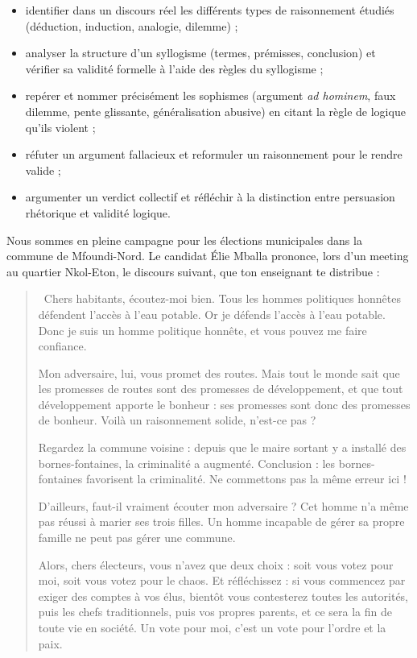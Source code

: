 \documentclass[11pt]{article}
\newcommand{\cle}[1]{{\popxbold\color{popdark}#1}}
\newcounter{popsec}
\newcounter{popsub}
\newcommand{\courssub}[1]{%
  \stepcounter{popsub}%
  \par\vspace{9pt}\noindent{\popxbold\fontsize{11.5}{13}\selectfont\color{popink}{\color{poporange}\thepopsec.\thepopsub}\hspace{6pt}#1}\par\nopagebreak\vspace{4pt}
}
\begin{document}
\begin{itemize}
\item \cle{identifier} dans un discours réel les différents types de raisonnement étudiés (déduction, induction, analogie, dilemme) ;
\item \cle{analyser} la structure d'un syllogisme (termes, prémisses, conclusion) et \cle{vérifier} sa validité formelle à l'aide des règles du syllogisme ;
\item \cle{repérer} et \cle{nommer} précisément les sophismes (argument \emph{ad hominem}, faux dilemme, pente glissante, généralisation abusive) en citant la règle de logique qu'ils violent ;
\item \cle{réfuter} un argument fallacieux et \cle{reformuler} un raisonnement pour le rendre valide ;
\item \cle{argumenter} un verdict collectif et réfléchir à la distinction entre persuasion rhétorique et validité logique.
\end{itemize}

\courssub{Situation}

Nous sommes en pleine campagne pour les élections municipales dans la commune de Mfoundi-Nord. Le candidat Élie Mballa prononce, lors d'un meeting au quartier Nkol-Eton, le discours suivant, que ton enseignant te distribue :

\begin{quote}
\guillemotleft\ Chers habitants, écoutez-moi bien. Tous les hommes politiques honnêtes défendent l'accès à l'eau potable. Or je défends l'accès à l'eau potable. Donc je suis un homme politique honnête, et vous pouvez me faire confiance.

Mon adversaire, lui, vous promet des routes. Mais tout le monde sait que les promesses de routes sont des promesses de développement, et que tout développement apporte le bonheur : ses promesses sont donc des promesses de bonheur. Voilà un raisonnement solide, n'est-ce pas ?

Regardez la commune voisine : depuis que le maire sortant y a installé des bornes-fontaines, la criminalité a augmenté. Conclusion : les bornes-fontaines favorisent la criminalité. Ne commettons pas la même erreur ici !

D'ailleurs, faut-il vraiment écouter mon adversaire ? Cet homme n'a même pas réussi à marier ses trois filles. Un homme incapable de gérer sa propre famille ne peut pas gérer une commune.

Alors, chers électeurs, vous n'avez que deux choix : soit vous votez pour moi, soit vous votez pour le chaos. Et réfléchissez : si vous commencez par exiger des comptes à vos élus, bientôt vous contesterez toutes les autorités, puis les chefs traditionnels, puis vos propres parents, et ce sera la fin de toute vie en société. Un vote pour moi, c'est un vote pour l'ordre et la paix. \guillemotright
\end{quote}
\end{document}
